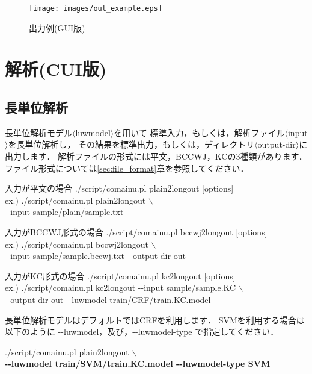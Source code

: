 \documentclass[titlepage]{jarticle}
\begin{document}
\begin{figure}[!ht]
\begin{center}
\texttt{[image: images/out\_example.eps]}
\vspace{10mm}
\caption{出力例(GUI版)}
\label{gui_example}
\end{center}
\end{figure}

\clearpage

\section{解析(CUI版)}

\subsection{長単位解析}\label{long_cui}
長単位解析モデル$\langle$luwmodel$\rangle$を用いて
標準入力，もしくは，解析ファイル$\langle$input$\rangle$を長単位解析し，
その結果を標準出力，もしくは，ディレクトリ$\langle$output-dir$\rangle$に出力します．
解析ファイルの形式には平文，BCCWJ，KCの3種類があります．
ファイル形式については\ref{sec:file_format}章を参照してください．
\begin{itembox}[l]{入力が平文の場合}
./script/comainu.pl plain2longout [options] \\
ex.) ./script/comainu.pl plain2longout $\backslash$ \\
\hspace{10mm} {-}{-}input sample/plain/sample.txt
\end{itembox}
\begin{itembox}[l]{入力がBCCWJ形式の場合}
./script/comainu.pl bccwj2longout [options] \\
ex.) ./script/comainu.pl bccwj2longout $\backslash$ \\
\hspace{10mm} {-}{-}input sample/sample.bccwj.txt {-}{-}output-dir out
\end{itembox}
\begin{itembox}[l]{入力がKC形式の場合}
./script/comainu.pl kc2longout [options] \\
ex.) ./script/comainu.pl kc2longout {-}{-}input sample/sample.KC $\backslash$ \\
\hspace{10mm} {-}{-}output-dir out {-}{-}luwmodel train/CRF/train.KC.model
\end{itembox}


長単位解析モデルはデフォルトではCRFを利用します．
SVMを利用する場合は以下のように {-}{-}luwmodel，及び，{-}{-}luwmodel-type で指定してください．
\begin{screen}
./script/comainu.pl plain2longout $\backslash$ \\
\hspace{5mm} \textbf{{-}{-}luwmodel train/SVM/train.KC.model {-}{-}luwmodel-type SVM}
\end{screen}
\end{document}
